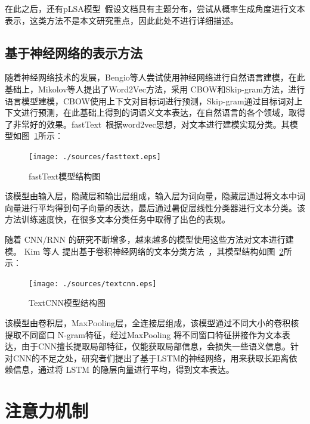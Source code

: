 在此之后，还有pLSA模型~\cite{Hofmann99}假设文档具有主题分布，尝试从概率生成角度进行文本表示，这类方法不是本文研究重点，因此此处不进行详细描述。

\subsection{基于神经网络的表示方法}
随着神经网络技术的发展，Bengio等人尝试使用神经网络进行自然语言建模\cite{BengioDV00}，在此基础上，Mikolov等人提出了Word2Vec方法\cite{abs-1301-3781}，采用 CBOW和Skip-gram方法，进行语言模型建模，CBOW使用上下文对目标词进行预测，Skip-gram通过目标词对上下文进行预测，在此基础上得到的词语义文本表达，在自然语言的各个领域，取得了非常好的效果。fastText~\cite{GraveMJB17}根据word2vec思想，对文本进行建模实现分类。其模型如图~\ref{fig:fasttext}所示：
\begin{figure}[t!]
    \centering
    \texttt{[image: ./sources/fasttext.eps]}
    \vspace{-10pt}
    \caption{\label{fig:fasttext} fastText模型结构图}
    \vspace{-5pt}
\end{figure}

该模型由输入层，隐藏层和输出层组成，输入层为词向量，隐藏层通过将文本中词向量进行平均得到句子向量的表达，最后通过暑促层线性分类器进行文本分类。该方法训练速度快，在很多文本分类任务中取得了出色的表现。

随着 CNN/RNN 的研究不断增多，越来越多的模型使用这些方法对文本进行建模。 Kim 等人
提出基于卷积神经网络的文本分类方法~\cite{Kim14}，其模型结构如图~\ref{fig:textcnn}所示：
\begin{figure}[t!]
    \centering
    \texttt{[image: ./sources/textcnn.eps]}
    \vspace{-10pt}
    \caption{\label{fig:textcnn} TextCNN模型结构图}
    \vspace{-5pt}
\end{figure}

该模型由卷积层，MaxPooling层，全连接层组成，该模型通过不同大小的卷积核提取不同窗口 N-gram特征，经过MaxPooling 将不同窗口特征拼接作为文本表达，由于CNN擅长提取局部特征，仅能获取局部信息，会损失一些语义信息。针对CNN的不足之处，研究者们提出了基于LSTM的神经网络，用来获取长距离依赖信息，通过将 LSTM 的隐层向量进行平均，得到文本表达。


\section{注意力机制}

